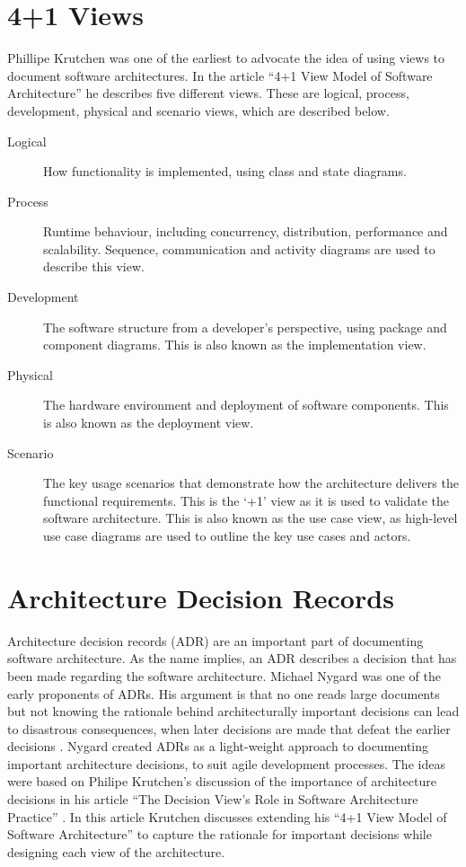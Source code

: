 \section{4+1 Views}
Phillipe Krutchen was one of the earliest to advocate the idea of using views to document software architectures.
In the article ``4+1 View Model of Software Architecture'' \cite{4+1-model} he describes five different views.
These are logical, process, development, physical and scenario views, which are described below.
\begin{description}
    \item[Logical] How functionality is implemented, using class and state diagrams.
    \item[Process] Runtime behaviour, including concurrency, distribution, performance and scalability.
                            Sequence, communication and activity diagrams are used to describe this view.
    \item[Development] The software structure from a developer's perspective, using package and component diagrams.
                                    This is also known as the implementation view.
    \item[Physical] The hardware environment and deployment of software components.
                            This is also known as the deployment view.
    \item[Scenario] The key usage scenarios that demonstrate how the architecture delivers the functional requirements.
                             This is the `+1' view as it is used to validate the software architecture.
                             This is also known as the use case view, as high-level use case diagrams are used to outline the key use cases and actors.
\end{description}

\section{Architecture Decision Records}
Architecture decision records (ADR) are an important part of documenting software architecture.
As the name implies, an ADR describes a decision that has been made regarding the software architecture.
Michael Nygard was one of the early proponents of ADRs.
His argument is that no one reads large documents but not knowing the rationale behind architecturally important decisions
can lead to disastrous consequences, when later decisions are made that defeat the earlier decisions \cite{nygard-adr}.
Nygard created ADRs as a light-weight approach to documenting important architecture decisions, to suit agile development processes.
The ideas were based on Philipe Krutchen's discussion of the importance of architecture decisions in his article
``The Decision View's Role in Software Architecture Practice'' \cite{krutchen-arch-decisions}.
In this article Krutchen discusses extending his ``4+1 View Model of Software Architecture'' \cite{4+1-model}
to capture the rationale for important decisions while designing each view of the architecture.

